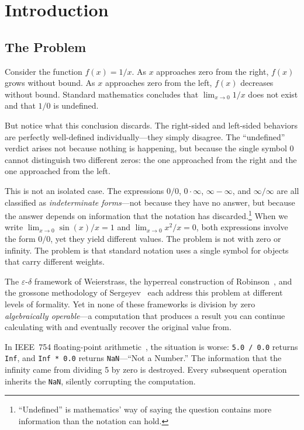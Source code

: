 \documentclass[12pt]{article}
\theoremstyle{definition}
\theoremstyle{remark}
\begin{document}
\section{Introduction}
\label{sec:intro}

\subsection{The Problem}
\label{subsec:problem}

Consider the function $f(x) = 1/x$. As $x$ approaches zero from the right,
$f(x)$ grows without bound. As $x$ approaches zero from the left, $f(x)$
decreases without bound. Standard mathematics concludes that $\lim_{x \to 0} 1/x$
does not exist and that $1/0$ is undefined.

But notice what this conclusion discards. The right-sided and left-sided
behaviors are perfectly well-defined individually---they simply disagree.
The ``undefined'' verdict arises not because nothing is happening, but
because the single symbol $0$ cannot distinguish two different zeros:
the one approached from the right and the one approached from the left.

This is not an isolated case. The expressions $0/0$, $0 \cdot \infty$,
$\infty - \infty$, and $\infty/\infty$ are all classified as
\emph{indeterminate forms}---not because they have no answer, but because
the answer depends on information that the notation has
discarded.\footnote{``Undefined'' is mathematics' way of saying the
question contains more information than the notation can hold.}
When we write $\lim_{x \to 0} \sin(x)/x = 1$ and
$\lim_{x \to 0} x^2/x = 0$, both expressions involve the form $0/0$,
yet they yield different values. The problem is not with zero or infinity.
The problem is that standard notation uses a single symbol for objects
that carry different weights.

The $\varepsilon$-$\delta$ framework of Weierstrass, the hyperreal
construction of Robinson~\cite{robinson1966}, and the grossone methodology
of Sergeyev~\cite{sergeyev2003} each address this problem at different
levels of formality. Yet in none of these frameworks is division by zero
\emph{algebraically operable}---a computation that produces a result you
can continue calculating with and eventually recover the original value from.

In IEEE~754 floating-point arithmetic~\cite{ieee754}, the situation is
worse: \texttt{5.0 / 0.0} returns \texttt{Inf}, and \texttt{Inf * 0.0}
returns \texttt{NaN}---``Not a Number.'' The information that the infinity
came from dividing 5 by zero is destroyed. Every subsequent operation
inherits the \texttt{NaN}, silently corrupting the computation.
\end{document}
